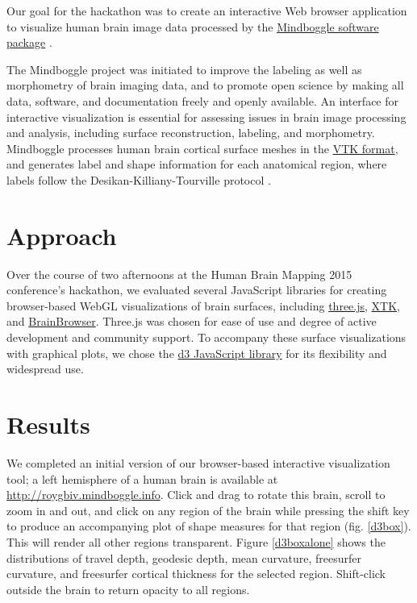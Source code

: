 \documentclass[twocolumn]{bmcart}%
\begin{document}
Our goal for the hackathon was to create an interactive Web browser
application to visualize human brain image data processed by the
\href{http://mindboggle.info/}{Mindboggle software package}
\cite{Klein2005}.

The Mindboggle project was initiated to improve the labeling as well as
morphometry of brain imaging data, and to promote open science by making
all data, software, and documentation freely and openly available. An
interface for interactive visualization is essential for assessing
issues in brain image processing and analysis, including surface
reconstruction, labeling, and morphometry. Mindboggle processes human
brain cortical surface meshes in the \href{http://www.vtk.org/}{VTK
format}, and generates label and shape information for each anatomical
region, where labels follow the Desikan-Killiany-Tourville protocol
\cite{Klein2012}.

\section{Approach}\label{approach}

Over the course of two afternoons at the Human Brain Mapping 2015
conference's hackathon, we evaluated several JavaScript libraries for
creating browser-based WebGL visualizations of brain surfaces, including
\href{http://threejs.org/}{three.js},
\href{https://github.com/xtk/X\#readme}{XTK}, and
\href{https://brainbrowser.cbrain.mcgill.ca/}{BrainBrowser}. Three.js
was chosen for ease of use and degree of active development and
community support. To accompany these surface visualizations with
graphical plots, we chose the \href{http://d3js.org/}{d3 JavaScript
library} for its flexibility and widespread use.

\section{Results}\label{results}

We completed an initial version of our browser-based interactive
visualization tool; a left hemisphere of a human brain is available at
\url{http://roygbiv.mindboggle.info}. Click and drag to rotate this
brain, scroll to zoom in and out, and click on any region of the brain
while pressing the shift key to produce an accompanying plot of shape
measures for that region (fig. \ref{d3box}). This will render all other
regions transparent. Figure \ref{d3boxalone} shows the distributions of
travel depth, geodesic depth, mean curvature, freesurfer curvature, and
freesurfer cortical thickness for the selected region. Shift-click
outside the brain to return opacity to all regions.
\end{document}

